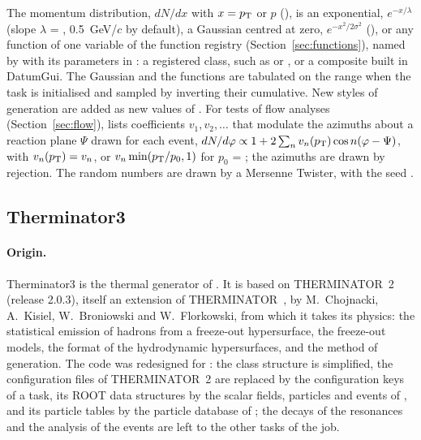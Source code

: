 The momentum distribution, $dN/dx$ with $x = p_{\mathrm{T}}$ or $p$ (), is an exponential,
$e^{-x/\lambda}$ (slope $\lambda$ = , 0.5~GeV/$c$ by default), a Gaussian centred at zero,
$e^{-x^2/2\sigma^2}$ (), or any function of one variable of the function registry
(Section~\ref{sec:functions}), named by  with its parameters in : a
registered class, such as  or , or a composite built in DatumGui. The Gaussian and
the functions are tabulated on the range when the task is initialised and sampled by inverting their cumulative.
New styles of generation are added as new values of . For tests of flow analyses
(Section~\ref{sec:flow}),  lists coefficients $v_1, v_2, \dots$ that modulate the azimuths about a
reaction plane $\Psi$ drawn for each event, $dN/d\varphi \propto 1 + 2\sum_n v_n(p_{\mathrm{T}})\cos n(\varphi-\Psi)$, with
$v_n(p_{\mathrm{T}}) = v_n$, or $v_n\min(p_{\mathrm{T}}/p_0,1)$ for $p_0$ = ; the azimuths are drawn by rejection. The
random numbers are drawn by a Mersenne Twister, with the seed .

\subsection{Therminator3}
\label{sec:therminator}

\paragraph{Origin.}
Therminator3 is the thermal generator of \Datum{}. It is based on THERMINATOR~2~\cite{Chojnacki:2011hb} (release 2.0.3),
itself an extension of THERMINATOR~\cite{Kisiel:2005hn}, by M.~Chojnacki, A.~Kisiel, W.~Broniowski and W.~Florkowski,
from which it takes its physics: the statistical emission of hadrons from a freeze-out hypersurface, the freeze-out
models, the format of the hydrodynamic hypersurfaces, and the method of generation. The code was redesigned for
\Datum{}: the class structure is simplified, the configuration files of THERMINATOR~2 are replaced by the configuration
keys of a task, its ROOT data structures by the scalar fields, particles and events of \Datum{}, and its particle tables
by the particle database of \Datum{}; the decays of the resonances and the analysis of the events are left to the
other tasks of the job.

